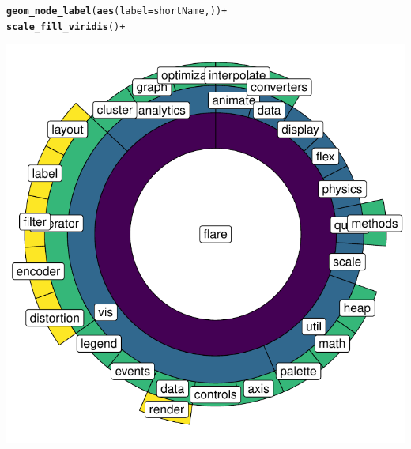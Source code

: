 \documentclass{article}\usepackage[]{graphicx}\usepackage[]{color}
\makeatletter
\def\maxwidth{ %
  \ifdim\Gin@nat@width>\linewidth
    \linewidth
  \else
    \Gin@nat@width
  \fi
}
\newcommand{\hlkwd}[1]{\textcolor[rgb]{0.737,0.353,0.396}{\textbf{#1}}}%
\newenvironment{kframe}{%
 \def\at@end@of@kframe{}%
 \ifinner\ifhmode%
  \def\at@end@of@kframe{\end{minipage}}%
  \begin{minipage}{\columnwidth}%
 \fi\fi%
 \def\FrameCommand##1{\hskip\@totalleftmargin \hskip-\fboxsep
 \colorbox{shadecolor}{##1}\hskip-\fboxsep
     \hskip-\linewidth \hskip-\@totalleftmargin \hskip\columnwidth}%
 \MakeFramed {\advance\hsize-\width
   \@totalleftmargin\z@ \linewidth\hsize
   \@setminipage}}%
 {\par\unskip\endMakeFramed%
 \at@end@of@kframe}
\newenvironment{knitrout}{}{} %
\makeatother
\begin{document}
\begin{knitrout}
\color{fgcolor}\begin{kframe}
\begin{alltt}
  \hlkwd{geom_node_label}( \hlkwd{aes}(label=shortName,)) +
  \hlkwd{scale_fill_viridis}() +
\end{alltt}
\end{kframe}
\end{knitrout}
\begin{knitrout}
\color{fgcolor}

{\centering \includegraphics[width=\maxwidth]{figure/plot_ggraph2-1} 

}



\end{knitrout}
\clearpage
\end{document}
